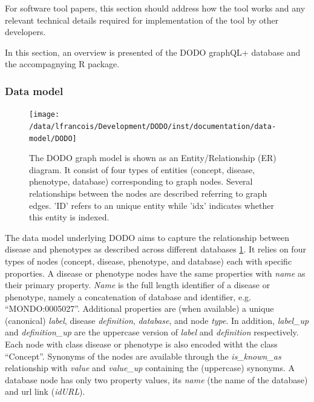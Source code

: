\documentclass[9pt,a4paper,]{extarticle}
\begin{document}
For software tool papers, this section should address how the tool works and any relevant technical details required for implementation of the tool by other developers.

In this section, an overview is presented of the DODO graphQL+ database and the accompagnying R package.

\hypertarget{data-model}{%
\subsubsection{Data model}\label{data-model}}

\begin{figure}

{\centering \texttt{[image: /data/lfrancois/Development/DODO/inst/documentation/data-model/DODO]} 

}

\caption{The DODO graph model is shown as an Entity/Relationship (ER) diagram. It consist of four types of entities (concept, disease, phenotype, database) corresponding to graph nodes. Several relationships between the nodes are described referring to graph edges. 'ID' refers to an unique entity while 'idx' indicates whether this entity is indexed.}\label{fig:dataModel}
\end{figure}

The data model underlying DODO aims to capture the relationship between disease and phenotypes as described across different databases \ref{fig:dataModel}. It relies on four types of nodes (concept, disease, phenotype, and database) each with specific proporties. A disease or phenotype nodes have the same properties with \emph{name} as their primary property. \emph{Name} is the full length identifier of a disease or phenotype, namely a concatenation of database and identifier, e.g. ``MONDO:0005027''. Additional properties are (when available) a unique (canonical) \emph{label}, disease \emph{definition}, \emph{database}, and node \emph{type}. In addition, \emph{label\_up} and \emph{definition\_up} are the uppercase version of \emph{label} and \emph{definition} respectively. Each node with class disease or phenotype is also encoded witht the class ``Concept''. Synonyms of the nodes are available through the \emph{is\_known\_as} relationship with \emph{value} and \emph{value\_up} containing the (uppercase) synonyms. A database node has only two property values, its \emph{name} (the name of the database) and url link (\emph{idURL}).
\end{document}
